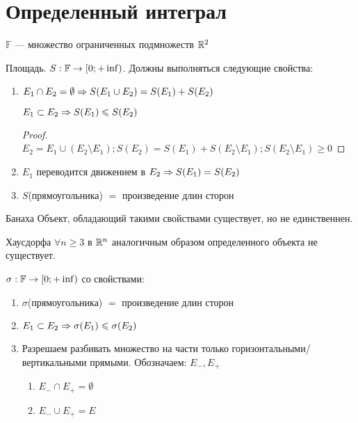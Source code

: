 ﻿\section{Определенный интеграл}

\begin{Def}
$\mathbb{F}$ --- множество ограниченных подмножеств $\mathbb{R}^2$
\end{Def}

\begin{Def}
Площадь. $S: \mathbb{F} \rightarrow [0; +\inf)$. Должны выполняться следующие свойства:

\begin{enumerate}
\item $E_1 \cap E_2 = \emptyset \Rightarrow S(E_1 \cup E_2) = S(E_1) + S(E_2)$
\begin{Sequence}
$E_1 \subset E_2 \Rightarrow S(E_1) \leqslant S(E_2)$
\end{Sequence}
\begin{proof}
$E_2 = E_1 \cup (E_2 \setminus E_1); S(E_2) = S(E_1) + S(E_2 \setminus E_1); S(E_2 \setminus E_1) \geqslant 0$
\end{proof}
\item $E_1$ переводится движением в $E_2 \Rightarrow S(E_1) = S(E_2)$
\item $S$(прямоугольника) $=$ произведение длин сторон
\end{enumerate} 
\end{Def}

\begin{theorem}{Банаха}
Объект, обладающий такими свойствами существует, но не единственнен.
\end{theorem}

\begin{theorem}{Хаусдорфа}
$\forall n \geqslant 3$ в $\mathbb{R}^n$ аналогичным образом определенного объекта не существует.
\end{theorem}

\begin{Def}
$\sigma: \mathbb{F} \rightarrow [0; +\inf)$ со свойствами:
\begin{enumerate}
\item $\sigma$(прямоугольника) $=$ произведение длин сторон
\item $E_1 \subset E_2 \Rightarrow \sigma(E_1) \leqslant \sigma(E_2)$
\item Разрешаем разбивать множество на части только горизонтальными/вертикальными прямыми. Обозначаем: $E_{-}, E_{+}$
\begin{enumerate}
\item $E_{-} \cap E_{+} = \emptyset$
\item $E_{-} \cup E_{+} = E$
\end{enumerate}
\end{enumerate} 
\end{Def}

